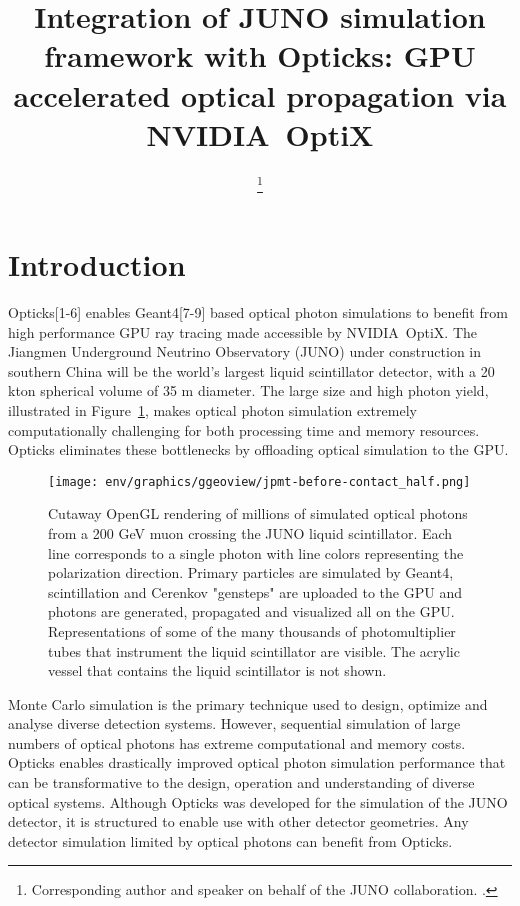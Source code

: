 \documentclass{webofc}
\begin{document}
%
\title{Integration of JUNO simulation framework with Opticks: GPU accelerated optical propagation via NVIDIA\textregistered\ OptiX\texttrademark}

\author{ \fnsep\thanks{Corresponding author and speaker on behalf of the JUNO collaboration. .}}



\abstract{%

}
%
\maketitle
%
%
\section{Introduction}%
\label{intro}
%
Opticks[1-6] enables Geant4[7-9] based optical photon simulations 
to benefit from high performance GPU ray tracing made accessible 
by NVIDIA\textregistered\ OptiX\texttrademark[10-12].
%
The Jiangmen Underground Neutrino Observatory (JUNO)\cite{juno} 
under construction in southern China will be the world's largest liquid scintillator detector, 
with a 20 kton spherical volume of 35 m diameter. The large size and high photon yield, illustrated in Figure~\ref{problem}, 
makes optical photon simulation extremely computationally challenging for both processing time and memory resources. 
Opticks eliminates these bottlenecks by offloading optical simulation to the GPU. 
%

%
\begin{figure}
\centering
\texttt{[image: env/graphics/ggeoview/jpmt-before-contact\_half.png]}
\caption{Cutaway OpenGL rendering of millions of simulated optical photons from a 200 GeV muon crossing the JUNO liquid scintillator. 
Each line corresponds to a single photon with line colors representing the polarization direction. Primary particles
are simulated by Geant4, scintillation and Cerenkov "gensteps" are uploaded to the GPU and photons are generated, propagated
and visualized all on the GPU. Representations of some of the many thousands of photomultiplier tubes that instrument the liquid scintillator are visible.
The acrylic vessel that contains the liquid scintillator is not shown.
}
\label{problem}
\end{figure}%
%
Monte Carlo simulation is the primary technique used to design, optimize 
and analyse diverse detection systems. However, sequential simulation of large numbers of 
optical photons has extreme computational and memory costs. 
Opticks enables drastically improved optical photon simulation performance that can be transformative 
to the design, operation and understanding of diverse optical systems.
%
Although Opticks was developed for the simulation of the JUNO detector, it 
is structured to enable use with other detector geometries. 
Any detector simulation limited by optical photons 
can benefit from Opticks.
\end{document}
